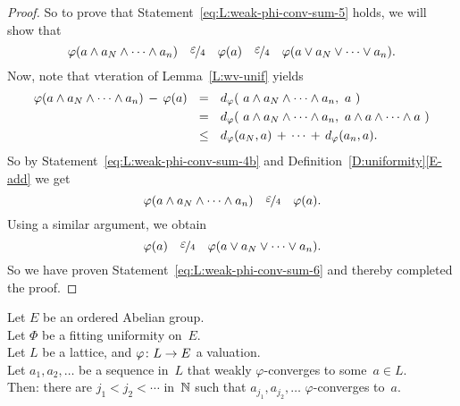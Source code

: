\documentclass[main.tex]{subfiles}
\begin{document}
\begin{proof}
So to prove that Statement~\eqref{eq:L:weak-phi-conv-sum-5}
holds, we will show that
\begin{equation}
\label{eq:L:weak-phi-conv-sum-6}
\varphi(a\wedge a_N\wedge \dotsb \wedge a_n)
\quad\smash{\nicefrac{\textstyle{\varepsilon}}{4}}\quad\varphi(a)\quad\smash{\nicefrac{\textstyle{\varepsilon}}{4}}\quad
\varphi(a\vee a_N\vee \dotsb \vee a_n).
\end{equation}
Now, note that vteration of Lemma~\ref{L:wv-unif} yields
\begin{alignat*}{3}
\varphi(a\wedge a_N\wedge \dotsb \wedge a_n)
\,-\, \varphi(a)
\ \ &=\ \ 
\ld\varphi(\ a\wedge a_N\wedge\dotsb \wedge a_n,\ a\ )  \\
\ \ &=\ \ 
\ld\varphi(\ a\wedge a_N\wedge\dotsb \wedge a_n,
                      \ a\wedge a\wedge \dotsb \wedge a \  ) \\
\ \ &\leq\ \ 
\ld\varphi(a_N,a) \,+\,\dotsb \,+\,\ld\varphi(a_n,a).
\end{alignat*}
So by Statement~\eqref{eq:L:weak-phi-conv-sum-4b}
and Definition~\ref{D:uniformity}\ref{E-add} we get
\begin{equation*}
\varphi(a\wedge a_N\wedge \dotsb \wedge a_n)
\quad\smash{\nicefrac{\textstyle{\varepsilon}}{4}}\quad\varphi(a).
\end{equation*}
Using a similar argument,
we obtain 
\begin{equation*}
\varphi(a)\quad\smash{\nicefrac{\textstyle{\varepsilon}}{4}}\quad
\varphi(a\vee a_N\vee \dotsb \vee a_n).
\end{equation*}
So we have proven Statement~\eqref{eq:L:weak-phi-conv-sum-6} and 
thereby completed the proof.
\end{proof}
%
%
\begin{prop}
\label{P:weak-phi-conv-subseq}
Let $E$ be an ordered Abelian group.\\
Let $\Phi$ be a fitting uniformity on~$E$.\\
Let $L$ be a lattice, and $\varphi\colon L \rightarrow E$ a valuation.\\
Let $a_1,a_2,\dotsc$ be a sequence in~$L$
that weakly $\varphi$-converges to some~$a\in L$.\\
Then: there are $j_1<j_2<\dotsb$ in~$\mathbb{N}$
such that $a_{j_1},a_{j_2},\dotsc$
$\varphi$-converges to~$a$.
\end{prop}
\end{document}
